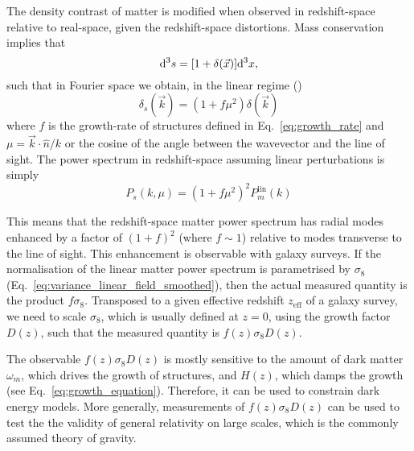     The density contrast of matter is modified when observed in redshift-space relative 
    to real-space, given the redshift-space distortions. Mass conservation implies that
    \begin{equation}
        [1+\delta_s(\vec{s})] \dinteg^3s = [1+\delta(\vec{x})]\dinteg^3 x,
        \label{eq:mass_conservation}
    \end{equation}
    such that in Fourier space we obtain, in the linear regime 
    (\cite{kaiserClusteringRealSpace1987})
    \begin{equation}
        \delta_s(\vec{k}) = (1 + f \mu^2 )\delta(\vec{k})
        \label{eq:delta_rsd_fourier}
    \end{equation}
    where $f$ is the growth-rate of structures defined in Eq.~\ref{eq:growth_rate} 
    and $\mu = \vec{k}\cdot \hat{n} / k$ or the cosine of the angle between the wavevector 
    and the line of sight. The power spectrum in redshift-space assuming linear 
    perturbations is simply 
    \begin{equation}
        P_s(k, \mu) = (1 + f\mu^2)^2 P_m^\mathrm{lin}(k)
        \label{eq:power_spectrum_rsd_linear}
    \end{equation}
    
    This means that the redshift-space matter power spectrum has radial modes enhanced 
    by a factor of $(1+f)^2$ (where $f \sim 1$) relative to modes transverse to the line 
    of sight.  This enhancement is observable with galaxy surveys. If the normalisation 
    of the linear matter power spectrum is parametrised by $\sigma_8$ 
    (Eq.~\ref{eq:variance_linear_field_smoothed}), then the actual measured quantity is 
    the product $f\sigma_8$. Transposed to a given effective redshift $z_\mathrm{eff}$
    of a galaxy survey, we need to scale $\sigma_8$, which is usually defined at $z=0$, 
    using the growth factor $D(z)$, such that the measured quantity is $f(z)\sigma_8 D(z)$. 
    
    The observable $f(z)\sigma_8 D(z)$ is mostly sensitive to the amount of 
    dark matter $\omega_m$, which drives the growth of structures, 
    and $H(z)$, which damps the growth (see Eq.~\ref{eq:growth_equation}). 
    Therefore, it can be used to constrain dark energy models. More generally, 
    measurements of $f(z)\sigma_8 D(z)$ can be used to test the 
    the validity of general relativity on large scales, which is 
    the commonly assumed theory of gravity. 

